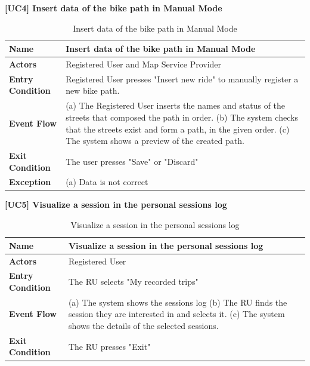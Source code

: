 \documentclass{article}
\begin{document}
\textbf{[UC4] Insert data of the bike path in Manual Mode}
\begin{table}[H]
    \centering
    \begin{tabularx}{\textwidth}{|l|X|}
        \hline
        \textbf{Name} & \textbf{Insert data of the bike path in Manual Mode} \\
        \hline
        \textbf{Actors} & Registered User and Map Service Provider\\
        \hline
        \textbf{Entry Condition} & Registered User presses "Insert new ride" to manually register a new bike path.\\
        \hline
        \textbf{Event Flow} & 
        (a) The Registered User inserts the names and status of the streets that composed the path in order.
        \vspace{0.2cm}
        \newline
        (b) The system checks that the streets exist and form a path, in the given order.
        \vspace{0.2cm}
        \newline
        (c) The system shows a preview of the created path.
        \\
        \hline
        \textbf{Exit Condition} & The user presses "Save" or "Discard" \\
        \hline
        \textbf{Exception} & (a) Data is not correct \\
        \hline
    \end{tabularx}
    \caption{Insert data of the bike path in Manual Mode}
\end{table}

\newpage
\textbf{[UC5] Visualize a session in the personal sessions log}
\begin{table}[H]
    \centering
    \begin{tabularx}{\textwidth}{|l|X|}
        \hline
        \textbf{Name} & \textbf{Visualize a session in the personal sessions log} \\
        \hline
        \textbf{Actors} & Registered User\\
        \hline
        \textbf{Entry Condition} & The RU selects "My recorded trips"\\
        \hline
        \textbf{Event Flow} & 
        (a) The system shows the sessions log
        \vspace{0.2cm}
        \newline
        (b) The RU finds the session they are interested in and selects it.
        \vspace{0.2cm}
        \newline
        (c) The system shows the details of the selected sessions.
        \\
        \hline
        \textbf{Exit Condition} & The RU presses "Exit" \\
        \hline
    \end{tabularx}
    \caption{Visualize a session in the personal sessions log}
\end{table}
\end{document}
